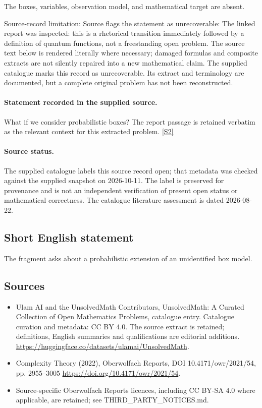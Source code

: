 \documentclass[11pt]{article}
\begin{document}
The boxes, variables, observation model, and mathematical target are absent.

Source-record limitation: Source flags the statement as unrecoverable: The linked report was inspected: this is a rhetorical transition immediately followed by a definition of quantum functions, not a freestanding open problem.
The source text below is rendered literally where necessary; damaged formulas and composite extracts are not silently repaired into a new mathematical claim.
The supplied catalogue marks this record as unrecoverable. Its extract and terminology are documented, but a complete original problem has not been reconstructed.
\paragraph{Statement recorded in the supplied source.}
What if we consider probabilistic boxes? The report passage is retained verbatim as the relevant context for this extracted problem. \href{https://doi.org/10.4171/owr/2021/54}{[S2]}
\paragraph{Source status.}
The supplied catalogue labels this source record open; that metadata was checked against the supplied snapshot on 2026-10-11. The label is preserved for provenance and is not an independent verification of present open status or mathematical correctness. The catalogue literature assessment is dated 2026-08-22.
\subsection{Short English statement}
The fragment asks about a probabilistic extension of an unidentified box model.
\subsection{Sources}
\begin{itemize}
\item[S1] Ulam AI and the UnsolvedMath Contributors, UnsolvedMath: A Curated Collection of Open Mathematics Problems, catalogue entry. Catalogue curation and metadata: CC BY 4.0. The source extract is retained; definitions, English summaries and qualifications are editorial additions.
\url{https://huggingface.co/datasets/ulamai/UnsolvedMath}.
\item[S2] Complexity Theory (2022), Oberwolfach Reports, DOI 10.4171/owr/2021/54, pp. 2955--3005
\url{https://doi.org/10.4171/owr/2021/54}.
\item Source-specific Oberwolfach Reports licences, including CC BY-SA 4.0 where applicable, are retained; see THIRD\_PARTY\_NOTICES.md.
\end{itemize}
\end{document}
